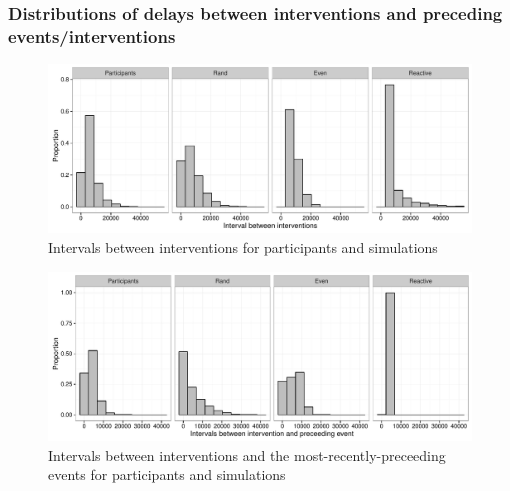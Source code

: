 \documentclass[12pt]{article}
\begin{document}
\FloatBarrier

\subsubsection{Distributions of delays between interventions and preceding events/interventions}

\begin{figure}[h]
   \centering
   \includegraphics[width = \columnwidth]{interintervention_intervals}
   \caption{Intervals between interventions for participants and simulations}
   \label{fig:interintervention_intervals}
\end{figure}

\begin{figure}[h]
   \centering
   \includegraphics[width = \columnwidth]{reaction_intervals}
   \caption{Intervals between interventions and the most-recently-preceeding events for participants and simulations}
   \label{fig:reaction_intervals}
\end{figure}





\end{document}
